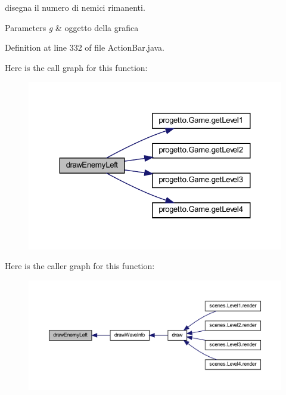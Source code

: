 disegna il numero di nemici rimanenti. 


\begin{DoxyParams}{Parameters}
{\em g} & oggetto della grafica \\
\hline
\end{DoxyParams}


Definition at line 332 of file Action\+Bar.\+java.

Here is the call graph for this function\+:\nopagebreak
\begin{figure}[H]
\begin{center}
\leavevmode
\includegraphics[width=324pt]{classui_1_1_action_bar_abb1fa26db5a1c2f4b0776a316ad85249_cgraph}
\end{center}
\end{figure}
Here is the caller graph for this function\+:\nopagebreak
\begin{figure}[H]
\begin{center}
\leavevmode
\includegraphics[width=350pt]{classui_1_1_action_bar_abb1fa26db5a1c2f4b0776a316ad85249_icgraph}
\end{center}
\end{figure}
\mbox{\label{classui_1_1_action_bar_a32afe6a393c6361d391e26ed96971131}} 
